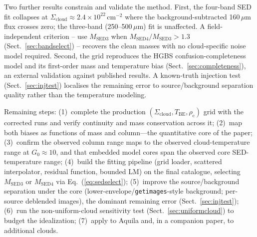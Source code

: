 \documentclass[11pt,a4paper]{article}
\newcommand{\rhoc}{\rho_{\mathrm{c}}}
\newcommand{\Tbe}{T_{\mathrm{BE}}}
\newcommand{\Scloud}{\Sigma_{\mathrm{cloud}}}
\begin{document}
Two further results constrain and validate the method. First, the four-band
SED fit collapses at $\Scloud\approx2.4\times10^{22}\,\mathrm{cm^{-2}}$
where the background-subtracted 160\,$\mu$m flux crosses zero; the
three-band (250--500\,$\mu$m) fit is unaffected. A field-independent
criterion -- use $M_{\mathrm{SED3}}$ when $M_{\mathrm{SED4}}/M_{\mathrm{SED3}}>1.3$
(Sect.~\ref{sec:bandselect}) -- recovers the clean masses with no cloud-specific
noise model required. Second, the grid reproduces the HGBS
confusion-completeness model and its first-order mass and temperature bias
(Sect.~\ref{sec:completeness}), an external validation against published
results. A known-truth injection test (Sect.~\ref{sec:injtest}) localises
the remaining error to source/background separation quality rather than the
temperature modeling.

Remaining steps:
(1)~complete the production $(\Scloud,\Tbe,\rhoc)$ grid with the corrected
runs and verify continuity and mass conservation across it;
(2)~map both biases as functions of mass and column---the quantitative core
of the paper;
(3)~confirm the observed column range maps to the observed cloud-temperature
range at $G_{0}\approx 10$, and that embedded model cores span the observed
core SED-temperature range;
(4)~build the fitting pipeline (grid loader, scattered interpolator,
residual function, bounded LM) on the final catalogue, selecting
$M_{\mathrm{SED3}}$ or $M_{\mathrm{SED4}}$ via Eq.~(\ref{eq:sedselect});
(5)~improve the source/background separation under the core
(lower-envelope/\texttt{getimages}-style background; per-source deblended
images), the dominant remaining error (Sect.~\ref{sec:injtest});
(6)~run the non-uniform-cloud sensitivity test (Sect.~\ref{sec:uniformcloud})
to budget the idealization;
(7)~apply to Aquila and, in a companion paper, to additional clouds.



\clearpage
\appendix
\end{document}

